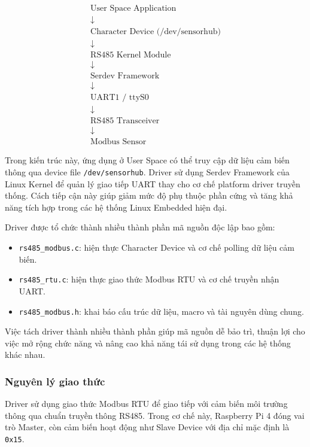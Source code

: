 \[
\begin{array}{c}
\text{User Space Application} \\
\downarrow \\
\text{Character Device (/dev/sensorhub)} \\
\downarrow \\
\text{RS485 Kernel Module} \\
\downarrow \\
\text{Serdev Framework} \\
\downarrow \\
\text{UART1 / ttyS0} \\
\downarrow \\
\text{RS485 Transceiver} \\
\downarrow \\
\text{Modbus Sensor}
\end{array}
\]

Trong kiến trúc này, ứng dụng ở User Space có thể truy cập dữ liệu cảm biến thông qua device file \texttt{/dev/sensorhub}. Driver sử dụng Serdev Framework của Linux Kernel để quản lý giao tiếp UART thay cho cơ chế platform driver truyền thống. Cách tiếp cận này giúp giảm mức độ phụ thuộc phần cứng và tăng khả năng tích hợp trong các hệ thống Linux Embedded hiện đại.

Driver được tổ chức thành nhiều thành phần mã nguồn độc lập bao gồm:
\begin{itemize}
    \item \texttt{rs485\_modbus.c}: hiện thực Character Device và cơ chế polling dữ liệu cảm biến.
    
    \item \texttt{rs485\_rtu.c}: hiện thực giao thức Modbus RTU và cơ chế truyền nhận UART.
    
    \item \texttt{rs485\_modbus.h}: khai báo cấu trúc dữ liệu, macro và tài nguyên dùng chung.
\end{itemize}

Việc tách driver thành nhiều thành phần giúp mã nguồn dễ bảo trì, thuận lợi cho việc mở rộng chức năng và nâng cao khả năng tái sử dụng trong các hệ thống khác nhau.

\subsubsection{Nguyên lý giao thức}

Driver sử dụng giao thức Modbus RTU để giao tiếp với cảm biến môi trường thông qua chuẩn truyền thông RS485. Trong cơ chế này, Raspberry Pi 4 đóng vai trò Master, còn cảm biến hoạt động như Slave Device với địa chỉ mặc định là \texttt{0x15}.

